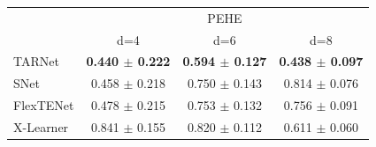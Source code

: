 \begin{tabular}{lccc}
\toprule
 & \multicolumn{3}{c}{PEHE} \\
 & d=4 & d=6 & d=8 \\
\midrule
TARNet & \textbf{0.440 $\pm$ 0.222} & \textbf{0.594 $\pm$ 0.127} & \textbf{0.438 $\pm$ 0.097} \\
SNet & 0.458 $\pm$ 0.218 & 0.750 $\pm$ 0.143 & 0.814 $\pm$ 0.076 \\
FlexTENet & 0.478 $\pm$ 0.215 & 0.753 $\pm$ 0.132 & 0.756 $\pm$ 0.091 \\
X-Learner & 0.841 $\pm$ 0.155 & 0.820 $\pm$ 0.112 & 0.611 $\pm$ 0.060 \\
\bottomrule
\end{tabular}
